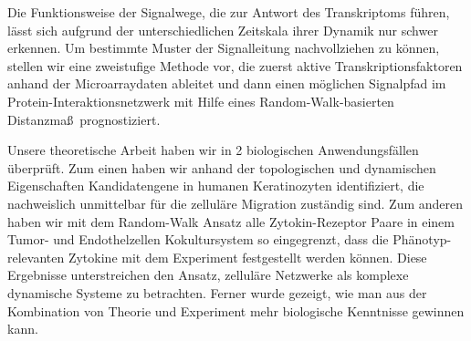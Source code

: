 Die Funktionsweise der Signalwege, die zur Antwort des
Transkriptoms f\"uhren, l\"asst sich aufgrund der 
unterschiedlichen
Zeitskala ihrer Dynamik nur schwer erkennen. Um bestimmte
Muster der Signalleitung nachvollziehen zu k\"onnen, stellen
wir eine zweistufige Methode vor, die zuerst aktive
Transkriptionsfaktoren anhand der Microarraydaten ableitet und
dann einen m\"oglichen Signalpfad im 
Protein-Interaktionsnetzwerk mit Hilfe eines 
Random-Walk-basierten Distanzma\ss \ prognostiziert.

Unsere theoretische Arbeit haben wir in 2 biologischen 
Anwendungsf\"allen \"uberpr\"uft. Zum einen haben wir
anhand der topologischen und dynamischen Eigenschaften
Kandidatengene in humanen Keratinozyten 
identifiziert, die nachweislich unmittelbar f\"ur die
zellul\"are Migration zust\"andig sind. Zum anderen
haben wir mit dem Random-Walk Ansatz 
alle Zytokin-Rezeptor Paare in einem Tumor-
und Endothelzellen Kokultursystem so eingegrenzt,
dass die Ph\"anotyp-relevanten Zytokine mit dem Experiment
festgestellt werden k\"onnen. Diese Ergebnisse unterstreichen
den Ansatz, 
zellul\"are Netzwerke als komplexe dynamische
Systeme zu betrachten. Ferner wurde gezeigt, wie man
aus der Kombination von Theorie und Experiment mehr 
biologische Kenntnisse gewinnen kann.

